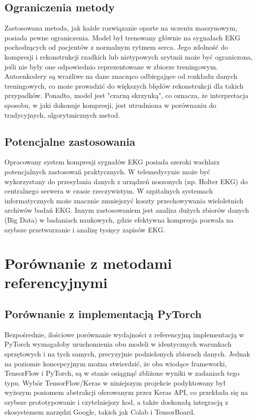 \documentclass[12pt,a4paper]{article}
\begin{document}
\subsection{Ograniczenia metody}

Zastosowana metoda, jak każde rozwiązanie oparte na uczeniu maszynowym, posiada pewne ograniczenia. Model był trenowany głównie na sygnałach EKG pochodzących od pacjentów z normalnym rytmem serca. Jego zdolność do kompresji i rekonstrukcji rzadkich lub nietypowych arytmii może być ograniczona, jeśli nie były one odpowiednio reprezentowane w zbiorze treningowym. Autoenkodery są wrażliwe na dane znacząco odbiegające od rozkładu danych treningowych, co może prowadzić do większych błędów rekonstrukcji dla takich przypadków. Ponadto, model jest "czarną skrzynką", co oznacza, że interpretacja sposobu, w jaki dokonuje kompresji, jest utrudniona w porównaniu do tradycyjnych, algorytmicznych metod.

\subsection{Potencjalne zastosowania}

Opracowany system kompresji sygnałów EKG posiada szeroki wachlarz potencjalnych zastosowań praktycznych. W telemedycynie może być wykorzystany do przesyłania danych z urządzeń noszonych (np. Holter EKG) do centralnego serwera w czasie rzeczywistym. W szpitalnych systemach informatycznych może znacznie zmniejszyć koszty przechowywania wieloletnich archiwów badań EKG. Innym zastosowaniem jest analiza dużych zbiorów danych (Big Data) w badaniach naukowych, gdzie efektywna kompresja pozwala na szybsze przetwarzanie i analizę tysięcy zapisów EKG.

\section{Porównanie z metodami referencyjnymi}

\subsection{Porównanie z implementacją PyTorch}

Bezpośrednie, ilościowe porównanie wydajności z referencyjną implementacją w PyTorch wymagałoby uruchomienia obu modeli w identycznych warunkach sprzętowych i na tych samych, precyzyjnie podzielonych zbiorach danych. Jednak na poziomie koncepcyjnym można stwierdzić, że oba wiodące frameworki, TensorFlow i PyTorch, są w stanie osiągnąć zbliżone wyniki w zadaniach tego typu. Wybór TensorFlow/Keras w niniejszym projekcie podyktowany był wyższym poziomem abstrakcji oferowanym przez Keras API, co przekłada się na szybsze prototypowanie i czytelniejszy kod, a także doskonałą integracją z ekosystemem narzędzi Google, takich jak Colab i TensorBoard.
\end{document}
